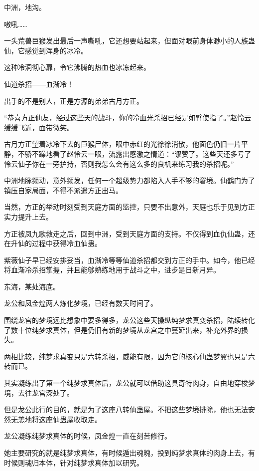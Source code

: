 
\begin{this_body}

中洲，地沟。

嗷吼……

一头荒兽巨猴发出最后一声嘶吼，它还想要站起来，但面对眼前身体渺小的人族蛊仙，它感觉到浑身的冰冷。

这种冷洞彻心扉，令它沸腾的热血也冰冻起来。

仙道杀招――血渐冷！

出手的不是别人，正是方源的弟弟古月方正。

“恭喜方正仙友，经过这些天的战斗，你的冷血光杀招已经是如臂使指了。”赵怜云缓缓飞近，面带微笑。

古月方正望着冰冷下去的巨猴尸体，眼中赤红的光徐徐消散，他面色仍旧一片平静，不骄不躁地看了赵怜云一眼，流露出感激之情道：“谬赞了。这些天还多亏了怜云仙子你在一旁护持，否则我怎么会有这么多的良机来练习我的杀招呢。”

中洲地脉频动，意外频发，任何一个超级势力都陷入人手不够的窘境。仙鹤门为了镇压自家局面，不得不派遣方正出马。

当然，方正的举动时刻受到天庭方面的监控，只要不出意外，天庭也乐于见到方正实力提升上去。

方正被凤九歌救走之后，回到中洲，受到天庭方面的支持。不仅得到血仇仙蛊，还在升仙的过程中获得冷血仙蛊。

紫薇仙子早已经安排妥当，血渐冷等等仙道杀招都交到方正的手中。如今，他已经将血渐冷杀招掌握，并且能够熟练地用于战斗之中，进步是日新月异。

东海，某处海底。

龙公和凤金煌两人炼化梦境，已经有数天时间了。

围绕龙宫的梦境远比想象中要多得多，龙公这些天操纵纯梦求真变杀招，陆续转化了数十位纯梦求真体，但是仍旧有新的梦境从龙宫之中蔓延出来，补充外界的损失。

两相比较，纯梦求真变只是六转杀招，威能有限，因为它的核心仙蛊梦翼也只是六转而已。

其实凝练出了第一个纯梦求真体后，龙公就可以借助这具奇特肉身，自由地穿梭梦境，去往龙宫深处了。

但是龙公此行的目的，就是为了这座八转仙蛊屋。不把这些梦境排除，他也无法安然无恙地将这座仙蛊屋收取走。

龙公凝练纯梦求真体的时候，凤金煌一直在刻苦修行。

她主要研究的就是纯梦求真体，有时候遁出魂魄，投到纯梦求真体的肉身上去，有时候则魂归本体，针对纯梦求真体加以研究。


\end{this_body}

